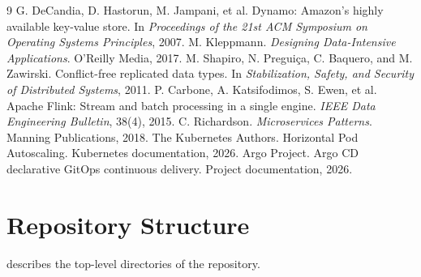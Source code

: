 \documentclass[11pt,a4paper]{article}
\begin{document}
\clearpage
\begin{thebibliography}{9}
 G. DeCandia, D. Hastorun, M. Jampani, et al. Dynamo: Amazon's highly available key-value store. In \emph{Proceedings of the 21st ACM Symposium on Operating Systems Principles}, 2007.
 M. Kleppmann. \emph{Designing Data-Intensive Applications}. O'Reilly Media, 2017.
 M. Shapiro, N. Pregui\c{c}a, C. Baquero, and M. Zawirski. Conflict-free replicated data types. In \emph{Stabilization, Safety, and Security of Distributed Systems}, 2011.
 P. Carbone, A. Katsifodimos, S. Ewen, et al. Apache Flink: Stream and batch processing in a single engine. \emph{IEEE Data Engineering Bulletin}, 38(4), 2015.
 C. Richardson. \emph{Microservices Patterns}. Manning Publications, 2018.
 The Kubernetes Authors. Horizontal Pod Autoscaling. Kubernetes documentation, 2026.
 Argo Project. Argo CD declarative GitOps continuous delivery. Project documentation, 2026.
\end{thebibliography}

\clearpage
\appendix

\section{Repository Structure}
\label{app:repo}

 describes the top-level directories of the repository.
\end{document}
